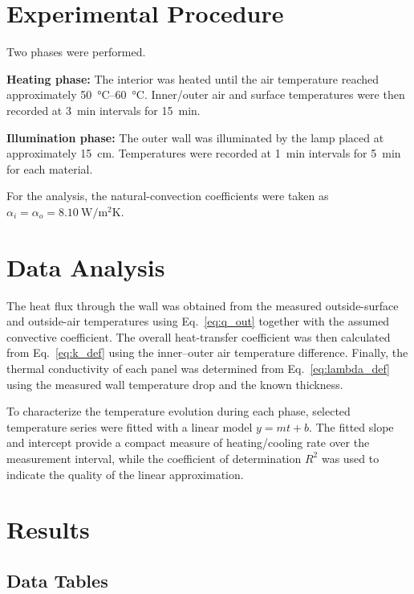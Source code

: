 \documentclass[journal]{IEEEtran}
\begin{document}
\section{Experimental Procedure}
Two phases were performed.

\textbf{Heating phase:} The interior was heated until the air temperature reached approximately \SIrange{50}{60}{\degreeCelsius}. Inner/outer air and surface temperatures were then recorded at \SI{3}{\minute} intervals for \SI{15}{\minute}.

\textbf{Illumination phase:} The outer wall was illuminated by the lamp placed at approximately \SI{15}{\centi\meter}. Temperatures were recorded at \SI{1}{\minute} intervals for \SI{5}{\minute} for each material.

For the analysis, the natural-convection coefficients were taken as $\alpha_i=\alpha_o=\SI{8.10}{\watt\per\meter\squared\kelvin}$.

\section{Data Analysis}
The heat flux through the wall was obtained from the measured outside-surface and outside-air temperatures using Eq.~\eqref{eq:q_out} together with the assumed convective coefficient. The overall heat-transfer coefficient was then calculated from Eq.~\eqref{eq:k_def} using the inner--outer air temperature difference. Finally, the thermal conductivity of each panel was determined from Eq.~\eqref{eq:lambda_def} using the measured wall temperature drop and the known thickness.

To characterize the temperature evolution during each phase, selected temperature series were fitted with a linear model $y=mt+b$. The fitted slope and intercept provide a compact measure of heating/cooling rate over the measurement interval, while the coefficient of determination $R^2$ was used to indicate the quality of the linear approximation.

\section{Results}

\subsection{Data Tables}
\end{document}
